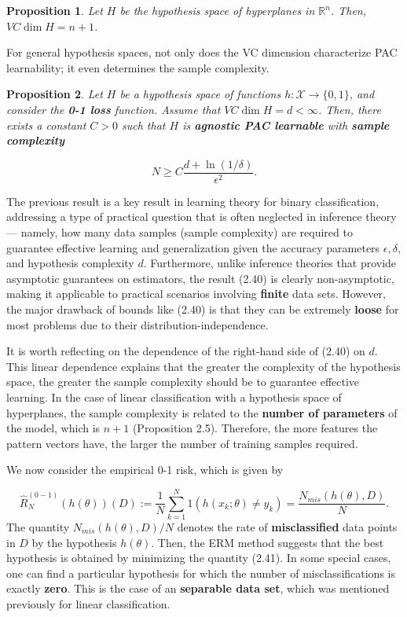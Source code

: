 \documentclass{report}
\newtheorem{proposition}{Proposition}[chapter]
\begin{document}
\begin{proposition}
Let $H$ be the hypothesis space of hyperplanes in $\mathbb{R}^n$. Then, $VC\dim H = n + 1$.
\end{proposition}
For general hypothesis spaces, not only does the VC dimension characterize PAC learnability; it even determines the sample complexity.

\begin{proposition}
Let $H$ be a hypothesis space of functions $h : \mathcal{X} \to \{0, 1\}$, and consider the \textbf{0-1 loss} function. Assume that $VC\dim H = d < \infty$. Then, there exists a constant $C> 0$ such that $H$ is \textbf{agnostic PAC learnable} with \textbf{sample complexity}

\begin{equation}
N \geq C\frac{d + \ln (1/\delta)}{\epsilon^2}.
\end{equation}
\end{proposition}
The previous result is a key result in learning theory for binary classification, addressing a type of practical question that is often neglected in inference theory — namely, how many data samples (sample complexity) are required to guarantee effective learning and generalization given the accuracy parameters $\epsilon, \delta$, and hypothesis complexity $d$. Furthermore, unlike inference theories that provide asymptotic guarantees on estimators, the result (2.40) is clearly non-asymptotic, making it applicable to practical scenarios involving \textbf{finite} data sets. However, the major drawback of bounds like (2.40) is that they can be extremely \textbf{loose} for most problems due to their distribution-independence.

It is worth reflecting on the dependence of the right-hand side of (2.40) on $d$. This linear dependence explains that the greater the complexity of the hypothesis space, the greater the sample complexity should be to guarantee effective learning. In the case of linear classification with a hypothesis space of hyperplanes, the sample complexity is related to the \textbf{number of parameters} of the model, which is $n + 1$ (Proposition 2.5). Therefore, the more features the pattern vectors have, the larger the number of training samples required.

We now consider the empirical 0-1 risk, which is given by

\begin{equation}
\hat{R}^{(0-1)}_N(h(\theta))(D) := \frac{1}{N}\sum_{k=1}^{N}1(h(x_k;\theta) \neq y_k) = \frac{N_{mis}(h(\theta),D)}{N}.
\end{equation}
The quantity $N_{mis}(h(\theta),D)/N$ denotes the rate of \textbf{misclassified} data points in $D$ by the hypothesis $h(\theta)$. Then, the ERM method suggests that the best hypothesis is obtained by minimizing the quantity (2.41). In some special cases, one can find a particular hypothesis for which the number of misclassifications is exactly \textbf{zero}. This is the case of an \textbf{separable data set}, which was mentioned previously for linear classification.
\end{document}
